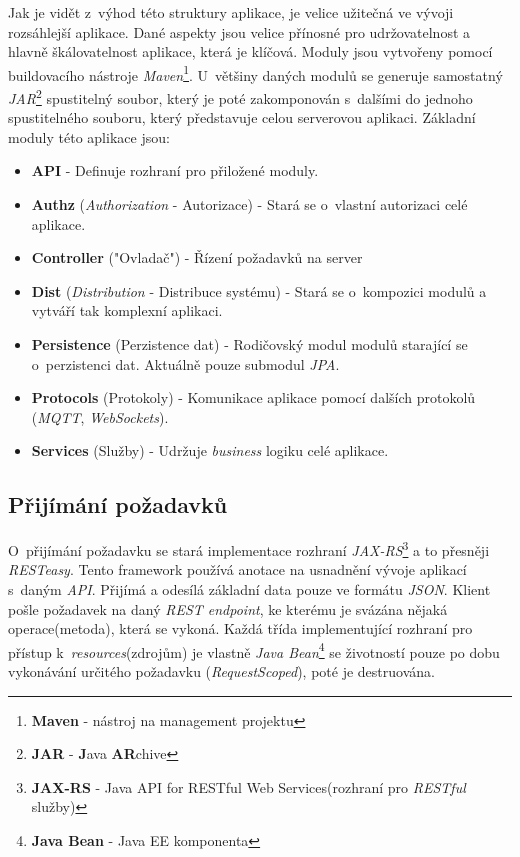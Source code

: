Jak je vidět z~výhod této struktury aplikace, je velice užitečná ve vývoji rozsáhlejší aplikace.
Dané aspekty jsou velice přínosné pro udržovatelnost a hlavně škálovatelnost aplikace, která je klíčová.
Moduly jsou vytvořeny pomocí buildovacího nástroje \emph{Maven}\footnote{\textbf{Maven} - nástroj na management projektu}.
U~většiny daných modulů se generuje samostatný \emph{JAR}\footnote{\textbf{JAR} - \textbf{J}ava \textbf{AR}chive} spustitelný soubor,
který je poté zakomponován s~dalšími do jednoho spustitelného souboru, který představuje celou serverovou aplikaci.
\newline
Základní moduly této aplikace jsou:
\begin{itemize}
  \item \textbf{API} - Definuje rozhraní pro přiložené moduly.
  \item \textbf{Authz} (\emph{Authorization} - Autorizace) - Stará se o~vlastní autorizaci celé aplikace.
  \item \textbf{Controller} ("Ovladač") - Řízení požadavků na server
  \item \textbf{Dist} (\emph{Distribution} - Distribuce systému) - Stará se o~kompozici modulů a vytváří tak komplexní aplikaci.
  \item \textbf{Persistence} (Perzistence dat) - Rodičovský modul modulů starající se o~perzistenci dat. Aktuálně pouze submodul \emph{JPA}.
  \item \textbf{Protocols} (Protokoly) - Komunikace aplikace pomocí dalších protokolů (\emph{MQTT}, \emph{WebSockets}).
  \item \textbf{Services} (Služby) - Udržuje \emph{business} logiku celé aplikace.
\end{itemize}

\newpage
\subsection*{Přijímání požadavků}
\label{impl:backend:request}
O~přijímání požadavku se stará implementace rozhraní \emph{JAX-RS}\footnote{\textbf{JAX-RS} - Java API for RESTful Web Services(rozhraní pro \emph{RESTful} služby)} a to přesněji \emph{RESTeasy}.
Tento framework používá anotace na usnadnění vývoje aplikací s~daným \emph{API}.
Přijímá a odesílá základní data pouze ve formátu \emph{JSON}.
Klient pošle požadavek na daný \emph{REST endpoint}, ke kterému je svázána nějaká operace(metoda), která se vykoná.
Každá třída implementující rozhraní pro přístup k~\emph{resources}(zdrojům) je vlastně \emph{Java Bean}\footnote{\textbf{Java Bean} - Java EE komponenta} se životností pouze po dobu vykonávání určitého požadavku (\emph{RequestScoped}), poté je destruována.


